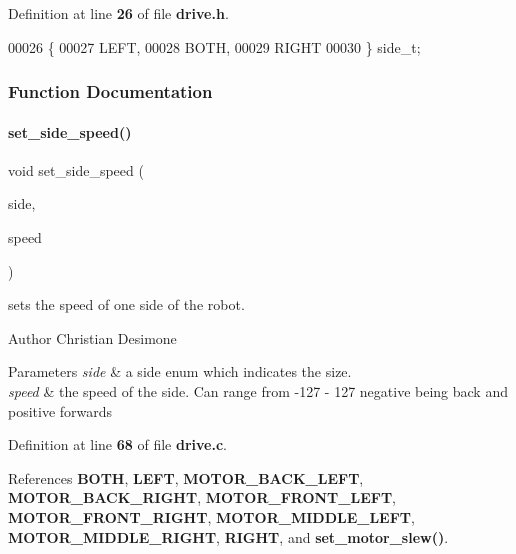 Definition at line \textbf{ 26} of file \textbf{ drive.\+h}.


\begin{DoxyCode}
00026                  \{
00027   LEFT,
00028   BOTH,
00029   RIGHT
00030 \} side_t;
\end{DoxyCode}


\subsubsection{Function Documentation}
\mbox{\label{drive_8h_a8df41fd50094c065eedc81fc5e6595d1}} 
\paragraph{set\+\_\+side\+\_\+speed()}
{\footnotesize\ttfamily void set\+\_\+side\+\_\+speed (\begin{DoxyParamCaption}\item[{\textbf{ side\+\_\+t}}]{side,  }\item[{int}]{speed }\end{DoxyParamCaption})}



sets the speed of one side of the robot. 

\begin{DoxyAuthor}{Author}
Christian Desimone 
\end{DoxyAuthor}

\begin{DoxyParams}{Parameters}
{\em side} & a side enum which indicates the size. \\
\hline
{\em speed} & the speed of the side. Can range from -\/127 -\/ 127 negative being back and positive forwards \\
\hline
\end{DoxyParams}


Definition at line \textbf{ 68} of file \textbf{ drive.\+c}.



References \textbf{ B\+O\+TH}, \textbf{ L\+E\+FT}, \textbf{ M\+O\+T\+O\+R\+\_\+\+B\+A\+C\+K\+\_\+\+L\+E\+FT}, \textbf{ M\+O\+T\+O\+R\+\_\+\+B\+A\+C\+K\+\_\+\+R\+I\+G\+HT}, \textbf{ M\+O\+T\+O\+R\+\_\+\+F\+R\+O\+N\+T\+\_\+\+L\+E\+FT}, \textbf{ M\+O\+T\+O\+R\+\_\+\+F\+R\+O\+N\+T\+\_\+\+R\+I\+G\+HT}, \textbf{ M\+O\+T\+O\+R\+\_\+\+M\+I\+D\+D\+L\+E\+\_\+\+L\+E\+FT}, \textbf{ M\+O\+T\+O\+R\+\_\+\+M\+I\+D\+D\+L\+E\+\_\+\+R\+I\+G\+HT}, \textbf{ R\+I\+G\+HT}, and \textbf{ set\+\_\+motor\+\_\+slew()}.



